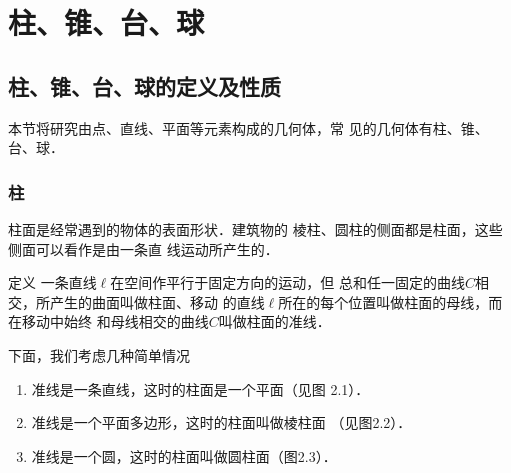 \chapter{柱、锥、台、球}

\section{柱、锥、台、球的定义及性质}
本节将研究由点、直线、平面等元素构成的几何体，常
见的几何体有柱、锥、台、球．

\subsection{柱}

柱面是经常遇到的物体的表面形状．建筑物的
棱柱、圆柱的侧面都是柱面，这些侧面可以看作是由一条直
线运动所产生的．

\begin{blk}{定义}
    一条直线$\ell$在空间作平行于固定方向的运动，但
总和任一固定的曲线$C$相交，所产生的曲面叫做柱面、移动
的直线$\ell$所在的每个位置叫做柱面的母线，而在移动中始终
和母线相交的曲线$C$叫做柱面的准线．
\end{blk}

下面，我们考虑几种简单情况
\begin{enumerate}
\item 准线是一条直线，这时的柱面是一个平面（见图
2.1）．
\item 准线是一个平面多边形，这时的柱面叫做棱柱面
（见图2.2）．
\item 准线是一个圆，这时的柱面叫做圆柱面（图2.3）．
\end{enumerate}

